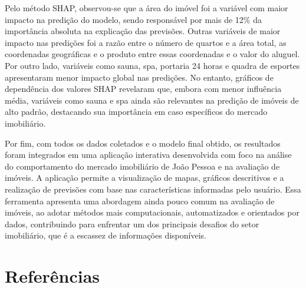 \documentclass[
  12pt,
  a4paper,
]{scrreprt}
\begin{document}
\vspace{12pt}

Pelo método SHAP, observou-se que a área do imóvel foi a variável com
maior impacto na predição do modelo, sendo responsável por mais de 12\%
da importância absoluta na explicação das previsões. Outras variáveis de
maior impacto nas predições foi a razão entre o número de quartos e a
área total, as coordenadas geográficas e o produto entre essas
coordenadas e o valor do aluguel. Por outro lado, variáveis como sauna,
spa, portaria 24 horas e quadra de esportes apresentaram menor impacto
global nas predições. No entanto, gráficos de dependência dos valores
SHAP revelaram que, embora com menor influência média, variáveis como
sauna e spa ainda são relevantes na predição de imóveis de alto padrão,
destacando sua importância em caso específicos do mercado imobiliário.

\vspace{12pt}

Por fim, com todos os dados coletados e o modelo final obtido, os
resultados foram integrados em uma aplicação interativa desenvolvida com
foco na análise do comportamento do mercado imobiliário de João Pessoa e
na avaliação de imóveis. A aplicação permite a visualização de mapas,
gráficos descritivos e a realização de previsões com base nas
características informadas pelo usuário. Essa ferramenta apresenta uma
abordagem ainda pouco comum na avaliação de imóveis, ao adotar métodos
mais computacionais, automatizados e orientados por dados, contribuindo
para enfrentar um dos principais desafios do setor imobiliário, que é a
escassez de informações disponíveis.

\chapter*{\texorpdfstring{\centering Referências}{Referências}}\label{referuxeancias}

\end{document}
